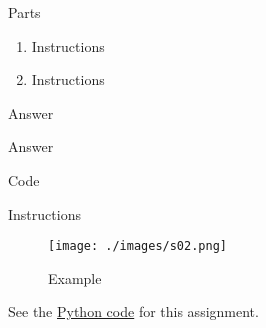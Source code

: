 


%
%

\newcommand{\hmwkTitle}{HW00}
\newcommand{\hmwkSubTitle}{Homework Template}
\newcommand{\hmwkDueDate}{September 25th. 2025}
\newcommand{\hmwkDueTime}{09:30 AM}
\newcommand{\hmwkClass}{ENAE 441 - 0101}
\newcommand{\hmwkClassTime}{09:30 AM}
\newcommand{\hmwkClassInstructor}{Dr. Martin}
\newcommand{\hmwkAuthorName}{\textbf{Vai Srivastava}}
\newcommand{\hmwkCompletionDate}{\today}



\maketitle

\pagebreak

\begin{hwkProblem}{1}{Parts} \label{hwk:p01}

	\begin{enumerate}
		\item \label{hwk:p01a} Instructions
		\item \label{hwk:p01b} Instructions
	\end{enumerate}

	\hwkSol{} \label{hwk:s01}

	\hwkPart{} \label{hwk:s01a}

	Answer

	\hwkPart{} \label{hwk:s01b}

	Answer

\end{hwkProblem}

\begin{hwkProblem}{2}{Code} \label{hwk:p02}

	Instructions

	\hwkSol{} \label{hwk:s02}

	\begin{figure}[H] \label{fig:s02}
		\begin{center}
			\texttt{[image: ./images/s02.png]}
		\end{center}
		\caption{Example}
	\end{figure}

	\hwkCode{} \label{code:s02}

	See the \href{https://www.github.com/vaisriv/enae441-hw-template/blob/main/code/hw00.py}{Python code} for this assignment.

\end{hwkProblem}


